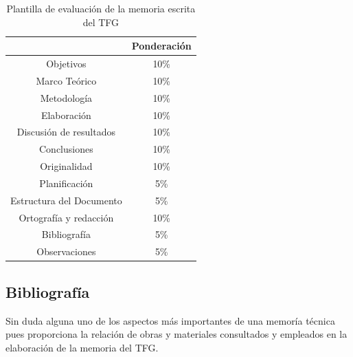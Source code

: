 \begin{list}
\begin{table}[h]
\begin{centering}
\begin{tabular}{|c|c|}
\hline 
 & {\footnotesize Ponderación}\tabularnewline
\hline 
\hline 
{\footnotesize Objetivos} & {\footnotesize 10\%}\tabularnewline
\hline 
{\footnotesize Marco Teórico} & {\footnotesize 10\%}\tabularnewline
\hline 
{\footnotesize Metodología} & {\footnotesize 10\%}\tabularnewline
\hline 
{\footnotesize Elaboración} & {\footnotesize 10\%}\tabularnewline
\hline 
{\footnotesize Discusión de resultados} & {\footnotesize 10\%}\tabularnewline
\hline 
{\footnotesize Conclusiones} & {\footnotesize 10\%}\tabularnewline
\hline 
{\footnotesize Originalidad} & {\footnotesize 10\%}\tabularnewline
\hline 
{\footnotesize Planificación} & {\footnotesize 5\%}\tabularnewline
\hline 
{\footnotesize Estructura del Documento} & {\footnotesize 5\%}\tabularnewline
\hline 
{\footnotesize Ortografía y redacción} & {\footnotesize 10\%}\tabularnewline
\hline 
{\footnotesize Bibliografía} & {\footnotesize 5\%}\tabularnewline
\hline 
{\footnotesize Observaciones} & {\footnotesize 5\%}\tabularnewline
\hline 
\end{tabular}
\par\end{centering}
\caption{\protect\label{tab:Plantilla-de-evaluaci=0000F3n}Plantilla de evaluación
de la memoria escrita del TFG}
\end{table}


\subsection{Bibliografía}

Sin duda alguna uno de los aspectos más importantes de una memoría
técnica pues proporciona la relación de obras y materiales consultados
y empleados en la elaboración de la memoria del TFG. 


\end{list}
